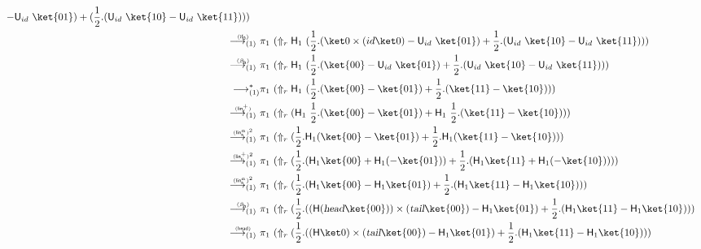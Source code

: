 \documentclass[preprint]{elsarticle}
\newcommand\lra[1][1]{\longrightarrow_{\left(#1\right)}}
\newcommand\pair[2]{({#1}+{#2})}
\newcommand\npair[2]{({#1}-{#2})}
\newcommand\s[1]{\ensuremath{\mathsf{#1}}}
\newcommand\head{\text{\sl head}}
\newcommand\tail{\text{\sl tail}}
\newcommand\red[2][1]{\overset{\scriptscriptstyle\smash{#2}\vphantom{x}}{\lra[#1]}\ }
\newcommand\rbetab{(\s{\beta_b})}
\newcommand\riffalse{(\s{if_{0}})}
\newcommand\rlinr{(\s{lin^+_r})}
\newcommand\rlinscalr{(\s{lin^\alpha_r})}
\newcommand\rhead{(\s{head})}
\begin{document}
\begin{align*}
\begin{aligned}[t]
                  -& { \s U_{id}\ \ket{01} }) +({ \frac 12. \npair{ \s U_{id}\
                      \ket{10} }{ \s U_{id}\ \ket{11} } }))
                \end{aligned}
  \\
  \red\riffalse&
                 \pi_1\ (\Uparrow_r\s H_1\
                 \pair
                 { \frac 12.  \npair{\ket 0\times(id\ket 0)} { \s U_{id}\ \ket{01} } }
                 { \frac 12.  \npair{ \s U_{id}\ \ket{10} }{ \s U_{id}\ \ket{11} } }) \\
  \red\rbetab&
               \pi_1\ (\Uparrow_r\s H_1\
               \pair
               { \frac 12.  \npair{\ket{00}} { \s U_{id}\ \ket{01} } }
               { \frac 12.  \npair{ \s U_{id}\ \ket{10} }{ \s U_{id}\ \ket{11} } }) \\
  \lra^*&
          \pi_1\ (\Uparrow_r\s H_1\
          \pair
          { \frac 12.  \npair{\ket{00}}{\ket{01}} }
          { \frac 12.  \npair{\ket{11}}{\ket{10}} }) \\
  \red\rlinr&
              \pi_1\ (\Uparrow_r
              \pair
              { \s H_1\ \frac 12.  \npair{\ket{00}}{\ket{01}} }
              { \s H_1\ \frac 12.  \npair{\ket{11}}{\ket{10}} }) \\
  \red{\rlinscalr^2}&
                      \pi_1\ (\Uparrow_r
                      \pair
                      { \frac 12.  \s H_1 \npair{\ket{00}}{\ket{01}} }
                      { \frac 12.  \s H_1 \npair{\ket{11}}{\ket{10}} }) \\
  \red{\rlinr^2}&
                  \pi_1\ (\Uparrow_r
                  \pair
                  { \frac 12.  \pair{\s H_1\ket{00}}{\s H_1(-\ket{01})} }
                  { \frac 12.  \pair{\s H_1\ket{11}}{\s H_1(-\ket{10})} }) \\
  \red{\rlinscalr^2}&
                      \pi_1\ (\Uparrow_r
                      \pair
                      { \frac 12.  \npair{\s H_1\ket{00}}{\s H_1\ket{01}} }
                      { \frac 12.  \npair{\s H_1\ket{11}}{\s H_1\ket{10}} }) \\
  \red\rbetab&
               \pi_1\ (\Uparrow_r
               \pair
               { \frac 12.  \npair{ (\s H(\head\ket{00}))\times(\tail\ket{00}) }{\s H_1\ket{01}} }
               { \frac 12.  \npair{\s H_1\ket{11}}{\s H_1\ket{10}} }) \\
  \red\rhead&
              \pi_1\ (\Uparrow_r
              \pair
              { \frac 12.  \npair{ (\s H\ket 0)\times(\tail\ket{00}) }{\s H_1\ket{01}} }
              { \frac 12.  \npair{\s H_1\ket{11}}{\s H_1\ket{10}} }) \\

\end{align*}
\end{document}
